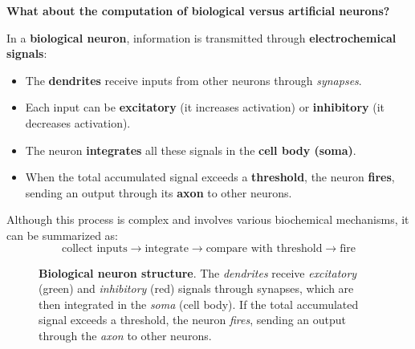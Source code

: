 \newpage

\begin{flushleft}
    \textcolor{Green3}{ \textbf{What about the computation of biological versus artificial neurons?}}
\end{flushleft}
\textcolor{Red2}{} In a \textbf{biological neuron}, information is transmitted through \textbf{electrochemical signals}:
\begin{itemize}
    \item The \textbf{dendrites} receive inputs from other neurons through \emph{synapses}.
    \item Each input can be \textbf{excitatory} (it increases activation) or \textbf{inhibitory} (it decreases activation).
    \item The neuron \textbf{integrates} all these signals in the \textbf{cell body (soma)}.
    \item When the total accumulated signal exceeds a \textbf{threshold}, the neuron \textbf{fires}, sending an output through its \textbf{axon} to other neurons.
\end{itemize}
Although this process is complex and involves various biochemical mechanisms, it can be summarized as:
\begin{equation*}
    \text{collect inputs} \rightarrow \text{integrate} \rightarrow \text{compare with threshold} \rightarrow \text{fire}
\end{equation*}

\begin{figure}[!htp]
    \centering
    
    \caption{\textbf{Biological neuron structure}. The \emph{dendrites} receive \emph{excitatory} (green) and \emph{inhibitory} (red) signals through synapses, which are then integrated in the \emph{soma} (cell body). If the total accumulated signal exceeds a threshold, the neuron \emph{fires}, sending an output through the \emph{axon} to other neurons.}
    \label{fig:biological-neuron}
\end{figure}

